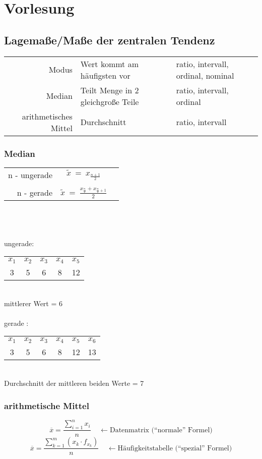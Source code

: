 \section{Vorlesung}


\subsection{Lagemaße/Maße der zentralen Tendenz}
\begin{tabular}{r|l|l}
     Modus                  & Wert kommt am häufigsten vor       & ratio, intervall, ordinal, nominal\\
     Median                 & Teilt Menge in 2 gleichgroße Teile & ratio, intervall, ordinal \\
     arithmetisches Mittel  & Durchschnitt                       & ratio, intervall
\end{tabular}


\subsubsection{Median}
\begin{tabular}{r|c|l}
     n - ungerade &$\widetilde{x}~=~x_{\frac{n+1}{2}}$&  \\
     {}&{}&{}\\
     n - gerade   &$\widetilde{x}~=~\frac{x_{\frac{n}{2}}+x_{\frac{n}{2}+1}}{2}$&
\end{tabular}\\\\
\\ungerade:
\begin{tabular}{cc|c|cc}
     $x_{1}$&$x_{2}$&$x_{3}$&$x_{4}$&$x_{5}$  \\
     3&5&6&8&12
\end{tabular}\\
mittlerer Wert = 6\\
\\
gerade :
\begin{tabular}{cc|cc|cc}
     $x_{1}$&$x_{2}$&$x_{3}$&$x_{4}$&$x_{5}$&$x_{6}$  \\
     3&5&6&8&12&13
\end{tabular}\\
Durchschnitt der mittleren beiden Werte = 7


\subsubsection{arithmetische Mittel}
\begin{equation*}
    \overline{x}=\frac{\sum_{i=1}^{n}x_{i}}{n}~~~~~\leftarrow \textrm{Datenmatrix (``normale'' Formel)}
\end{equation*}
  \vspace{0.5cm}
\begin{equation*}
     \overline{x}=\frac{\sum_{k=1}^{m}(x_{k}\cdot f_{{x}_{k}})}{n}~~~~~\leftarrow \textrm{Häufigkeitstabelle (``spezial'' Formel)}
\end{equation*}


